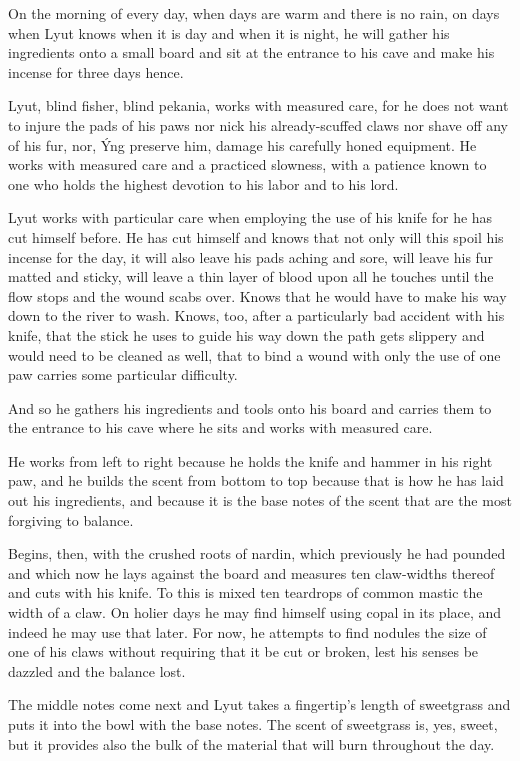 On the morning of every day, when days are warm and there is no rain, on days when Lyut knows when it is day and when it is night, he will gather his ingredients onto a small board and sit at the entrance to his cave and make his incense for three days hence.

Lyut, blind fisher, blind pekania, works with measured care, for he does not want to injure the pads of his paws nor nick his already-scuffed claws nor shave off any of his fur, nor, Ýng preserve him, damage his carefully honed equipment. He works with measured care and a practiced slowness, with a patience known to one who holds the highest devotion to his labor and to his lord.

Lyut works with particular care when employing the use of his knife for he has cut himself before. He has cut himself and knows that not only will this spoil his incense for the day, it will also leave his pads aching and sore, will leave his fur matted and sticky, will leave a thin layer of blood upon all he touches until the flow stops and the wound scabs over. Knows that he would have to make his way down to the river to wash. Knows, too, after a particularly bad accident with his knife, that the stick he uses to guide his way down the path gets slippery and would need to be cleaned as well, that to bind a wound with only the use of one paw carries some particular difficulty.

And so he gathers his ingredients and tools onto his board and carries them to the entrance to his cave where he sits and works with measured care.

He works from left to right because he holds the knife and hammer in his right paw, and he builds the scent from bottom to top because that is how he has laid out his ingredients, and because it is the base notes of the scent that are the most forgiving to balance.

Begins, then, with the crushed roots of nardin, which previously he had pounded and which now he lays against the board and measures ten claw-widths thereof and cuts with his knife. To this is mixed ten teardrops of common mastic the width of a claw. On holier days he may find himself using copal in its place, and indeed he may use that later. For now, he attempts to find nodules the size of one of his claws without requiring that it be cut or broken, lest his senses be dazzled and the balance lost.

The middle notes come next and Lyut takes a fingertip's length of sweetgrass and puts it into the bowl with the base notes. The scent of sweetgrass is, yes, sweet, but it provides also the bulk of the material that will burn throughout the day.

